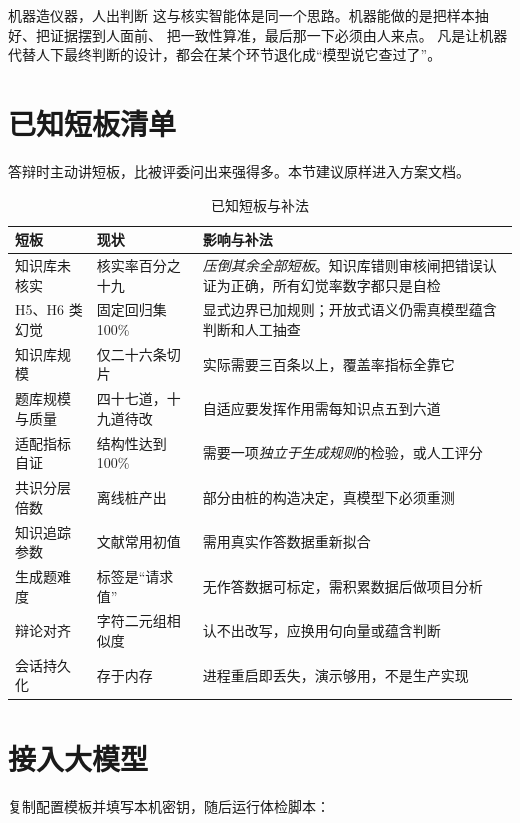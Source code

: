 \begin{keynote}{机器造仪器，人出判断}
这与核实智能体是同一个思路。机器能做的是把样本抽好、把证据摆到人面前、
把一致性算准，最后那一下必须由人来点。
凡是让机器代替人下最终判断的设计，都会在某个环节退化成“模型说它查过了”。
\end{keynote}

\section{已知短板清单}

答辩时主动讲短板，比被评委问出来强得多。本节建议原样进入方案文档。

\begin{table}[htbp]\centering\small
\caption{已知短板与补法}\label{tab:gaps}
\begin{tabular}{@{}p{2.4cm}p{3.4cm}p{6.2cm}@{}}
\toprule
短板 & 现状 & 影响与补法 \\
\midrule
知识库未核实 & 核实率百分之十九 & \emph{压倒其余全部短板}。知识库错则审核闸把错误认证为正确，所有幻觉率数字都只是自检 \\
H5、H6 类幻觉 & 固定回归集 100\% & 显式边界已加规则；开放式语义仍需真模型蕴含判断和人工抽查 \\
知识库规模 & 仅二十六条切片 & 实际需要三百条以上，覆盖率指标全靠它 \\
题库规模与质量 & 四十七道，十九道待改 & 自适应要发挥作用需每知识点五到六道 \\
适配指标自证 & 结构性达到 100\% & 需要一项\emph{独立于生成规则}的检验，或人工评分 \\
共识分层倍数 & 离线桩产出 & 部分由桩的构造决定，真模型下必须重测 \\
知识追踪参数 & 文献常用初值 & 需用真实作答数据重新拟合 \\
生成题难度 & 标签是“请求值” & 无作答数据可标定，需积累数据后做项目分析 \\
辩论对齐 & 字符二元组相似度 & 认不出改写，应换用句向量或蕴含判断 \\
会话持久化 & 存于内存 & 进程重启即丢失，演示够用，不是生产实现 \\
\bottomrule
\end{tabular}
\end{table}

\section{接入大模型}

复制配置模板并填写本机密钥，随后运行体检脚本：

